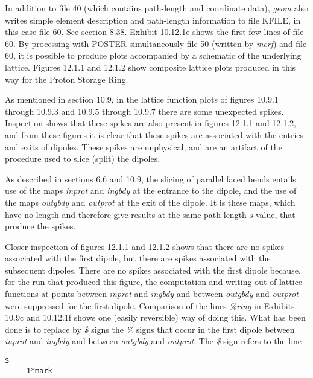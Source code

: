 In addition to file 40 (which contains path-length and coordinate data),
{\em geom} also writes simple element description and path-length
information to file KFILE, in this case file 60.  See section 8.38.
Exhibit 10.12.1e shows the first few lines of file 60.  By processing with POSTER
simultaneously file 50 (written by {\em merf}) and file 60, it is
possible to produce plots accompanied by a schematic of the underlying
lattice.  Figures 12.1.1 and 12.1.2 show composite lattice plots produced in
this way for the Proton Storage Ring.

As mentioned in section 10.9, in the lattice function plots of figures
10.9.1 through 10.9.3 and 10.9.5 through
10.9.7 there are some unexpected spikes.  Inspection shows that these spikes
are also present in figures 12.1.1 and 12.1.2, and from these figures it is
clear that these spikes are associated with the entries and exits of
dipoles.  These spikes are unphysical, and are an artifact of the
procedure used to slice (split) the dipoles.

As described in sections 6.6 and 10.9, the slicing of parallel faced bends
entails use of the maps {\em inprot} and {\em ingbdy} at the entrance to
the dipole, and the use of the maps {\em outgbdy} and {\em outprot} at
the exit of the dipole.  It is these maps, which have no length and
therefore give results at the same path-length {\em s} value, that produce the
spikes.

Closer inspection of figures 12.1.1 and 12.1.2 shows that there are no spikes
associated with the first dipole, but there are spikes associated with
the subsequent dipoles.  There are no spikes associated with the first
dipole because, for the \Mary run that produced this figure, the
computation and writing out of lattice functions at points between {\em
inprot} and {\em ingbdy} and between {\em outgbdy} and {\em outprot}
were suppressed for the first dipole.  Comparison of the lines {\em
\%ring} in Exhibits 10.9c and 10.12.1f shows one (easily
reversible) way of doing this.  What has
been done is to replace by {\em \$} signs the {\em \%} signs that occur in the
first dipole between {\em inprot} and {\em ingbdy} and between {\em
outgbdy} and {\em outprot}.  The {\em \$} sign refers to the line

\begin{footnotesize}
\begin{verbatim}
$
     1*mark
\end{verbatim}
\end{footnotesize}

